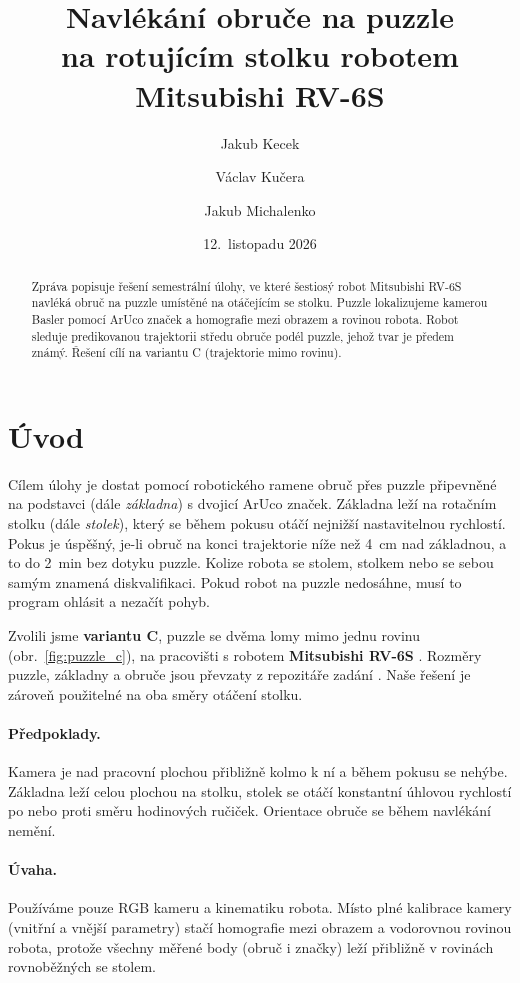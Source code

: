 \documentclass[11pt,a4paper]{article}
\title{Navlékání obruče na puzzle\\na rotujícím stolku robotem Mitsubishi RV-6S}
\author{Jakub Kecek \and Václav Kučera \and Jakub Michalenko}
\date{12.~listopadu 2026}
\begin{document}
\maketitle

\begin{abstract}
Zpráva popisuje řešení semestrální úlohy, ve které šestiosý robot Mitsubishi RV-6S
navléká obruč na puzzle umístěné na otáčejícím se stolku. Puzzle
lokalizujeme kamerou Basler pomocí ArUco značek
a homografie mezi obrazem a rovinou robota. Robot sleduje predikovanou
trajektorii středu obruče podél puzzle, jehož tvar je předem známý. 
Řešení cílí na variantu C (trajektorie mimo rovinu).
\end{abstract}

\tableofcontents

\section{Úvod}
\label{sec:uvod}

Cílem úlohy je dostat pomocí robotického ramene obruč přes puzzle
připevněné na podstavci (dále \emph{základna}) s dvojicí
ArUco značek. Základna leží na rotačním stolku (dále \emph{stolek}), který se
během pokusu otáčí nejnižší nastavitelnou rychlostí. Pokus je úspěšný, je-li obruč na konci
trajektorie níže než \SI{4}{cm} nad základnou, a to do \SI{2}{min} bez dotyku
puzzle. Kolize robota se stolem, stolkem nebo se sebou samým znamená
diskvalifikaci. Pokud robot na puzzle nedosáhne, musí to program ohlásit a nezačít
pohyb.

Zvolili jsme \textbf{variantu C}, puzzle se dvěma lomy mimo jednu rovinu
(obr.~\ref{fig:puzzle_c}), na pracovišti s robotem \textbf{Mitsubishi RV-6S}
\cite{stations}. Rozměry puzzle, základny a obruče jsou převzaty
z repozitáře zadání \cite{rob1hw}. Naše řešení je zároveň použitelné na oba směry otáčení stolku. 

\paragraph{Předpoklady.}
Kamera je nad pracovní plochou přibližně kolmo k ní a během pokusu se nehýbe.
Základna leží celou plochou na stolku, stolek se otáčí konstantní úhlovou
rychlostí po nebo proti směru hodinových ručiček. Orientace obruče se během navlékání nemění.

\paragraph{Úvaha.}
Používáme pouze RGB kameru a kinematiku robota. Místo plné kalibrace kamery
(vnitřní a vnější parametry) stačí homografie mezi obrazem a vodorovnou rovinou
robota, protože všechny měřené body (obruč i značky) leží přibližně v rovinách
rovnoběžných se stolem.
\end{document}
